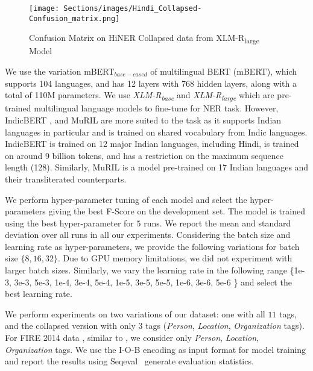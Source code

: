 \documentclass[10pt, a4paper]{article}
\begin{document}
\begin{figure}[!htb]
    \texttt{[image: Sections/images/Hindi\_Collapsed-Confusion\_matrix.png]}
    \caption{Confusion Matrix on HiNER Collapsed data from XLM-R\textsubscript{large} Model}
    \label{fig:confusionHiNERCollapsed}
\end{figure}

We use the variation mBERT$_{base-cased}$ of multilingual BERT (mBERT), which supports 104 languages, and has 12 layers with 768 hidden layers, along with a total of 110M parameters. We use \textit{XLM-R\textsubscript{base}} and \textit{XLM-R\textsubscript{large}} \cite{conneau-etal-2020-unsupervised} which are pre-trained multilingual language models to fine-tune for NER task. However, IndicBERT \cite{kakwani2020inlpsuite}, and MuRIL \cite{khanuja2021muril} are more suited to the task as it supports Indian languages in particular and is trained on shared vocabulary from Indic languages. IndicBERT is trained on 12 major Indian languages, including Hindi, is trained on around 9 billion tokens, and has a restriction on the maximum sequence length (128). Similarly, MuRIL is a model pre-trained on 17 Indian languages and their transliterated counterparts. 

We perform hyper-parameter tuning of each model and select the hyper-parameters giving the best F-Score on the development set. The model is trained using the best hyper-parameter for $5$ runs. We report the mean and standard deviation over all runs in all our experiments. Considering the batch size and learning rate as hyper-parameters, we provide the following variations for batch size $\{8, 16, 32\}$. Due to GPU memory limitations, we did not experiment with larger batch sizes. Similarly, we vary the learning rate in the following range \{1e-3, 3e-3, 5e-3, 1e-4, 3e-4, 5e-4, 1e-5, 3e-5, 5e-5, 1e-6, 3e-6, 5e-6 \} and select the best learning rate.

We perform experiments on two variations of our dataset: one with all $11$ tags, and the collapsed version with only $3$ tags (\textit{Person}, \textit{Location}, \textit{Organization} tags). For FIRE 2014 data \cite{FIRE2014}, similar to , we consider only \textit{Person}, \textit{Location}, \textit{Organization} tags. We use the I-O-B encoding as input format for model training and report the results using Seqeval~\cite{seqeval} generate evaluation statistics.
\end{document}
